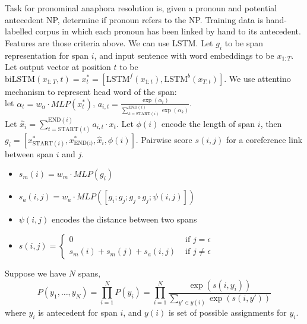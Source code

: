 \documentclass[12pt]{article}
\theoremstyle{definition}
\begin{document}
Task for pronominal anaphora resolution is, given a pronoun and potential antecedent NP, determine if pronoun refers to the NP. Training data is hand-labelled corpus in which each pronoun has been linked by hand to its antecedent.\\
Features are those criteria above. We can use LSTM.
Let $g_i$ to be span representation for span $i$, and input sentence with word embeddings to be $x_{1:T}$. Let output vector at position $t$ to be $\text{biLSTM}(x_{1:T}, t)=x_t^\ast = [\text{LSTM}^f(x_{1:t}), \text{LSTM}^b(x_{T:t})]$. We use attentino mechanism to represent head word of the span:\\
let $\alpha_t=w_\alpha\cdot MLP(x_t^\ast)$, $a_{i,t}=\frac{\exp(\alpha_t)}{\sum_{k=\text{START}(i)}^{\text{END}(i)}\exp(\alpha_k)}$.\\
Let $\hat{x}_i=\sum_{t=\text{START}(i)}^{\text{END}(i)}a_{i,t}\cdot x_t$.
Let $\phi(i)$ encode the length of span $i$, then $g_i = [x_{\text{START}(i)}^\ast, x_{\text{END(i)}}^\ast, \hat{x}_i, \phi(i)]$.
Pairwise score $s(i,j)$ for a coreference link between span $i$ and $j$.
\begin{itemize}
	\item $s_m(i)=w_m\cdot MLP(g_i)$
	\item $s_a(i,j)=w_a\cdot MLP([g_i; g_j; g_j\circ g_j; \psi(i,j)])$
	\item $\psi(i,j)$ encodes the distance between two spans
	\item $s(i,j)=\begin{cases}0 &\text{ if }j=\epsilon\\s_m(i) + s_m(j)+s_a(i,j)&\text{ if }j\neq \epsilon\end{cases}$
\end{itemize}
Suppose we have $N$ spans,
\[
P(y_1,\ldots, y_N)=\prod_{i=1}^N P(y_i)=\prod_{i=1}^N \frac{\exp(s(i,y_i))}{\sum_{y'\in y(i)}\exp(s(i, y'))}
\]
where $y_i$ is antecedent for span $i$, and $y(i)$ is set of possible assignments for $y_i$. 
\end{document}
